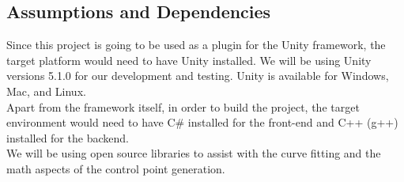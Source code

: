 \subsection{Assumptions and Dependencies}
Since this project is going to be used as a plugin for the Unity framework, the target platform would
need to have Unity installed. We will be using Unity versions 5.1.0 for our development and testing. Unity is available for Windows, Mac, and Linux.\\
Apart from the framework itself, in order to build the project, the target environment
would need to have C\# installed for the front-end and C++ (g++) installed for the backend.\\
We will be using open source libraries to assist with the curve fitting and the math aspects
of the control point generation.
